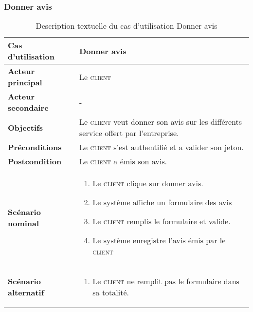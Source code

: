         \subsubsection[Donner avis]{Donner avis}
        \begin{longtable}{p{4cm} p{9cm}}
            \caption{Description textuelle du cas d’utilisation Donner avis}
            \label{table:usecaseDonnerAvis}
            \\\hline\hline
                \textbf{Cas d’utilisation} & \textbf{Donner avis}
            \\\hline\hline
                    \textbf{Acteur principal} & Le \textsc{client}
                \\
                    \textbf{Acteur secondaire} & -
                \\
                    \textbf{Objectifs} & Le \textsc{client} veut donner son avis sur
                    les différents service offert par l’entreprise.
                \\
                    \textbf{Préconditions} & Le \textsc{client} s’est authentifié et
                    a valider son jeton.
                \\
                    \textbf{Postcondition} & Le \textsc{client} a émis son avis.
                \\
                \textbf{Scénario nominal} &
                    \begin{enumerate}[leftmargin=*]
                        \item Le \textsc{client} clique sur donner avis.
                        \item Le système affiche un formulaire des avis
                        \item Le \textsc{client} remplis le formulaire et valide.
                        \item Le système enregistre l’avis émis par le \textsc{client}
                    \end{enumerate}
                \\
                \textbf{Scénario alternatif} &
                    \begin{enumerate}[leftmargin=*]
                        \item Le \textsc{client} ne remplit pas le formulaire
                        dans sa totalité.
                    \end{enumerate}
            \\\bottomrule
        \end{longtable}

